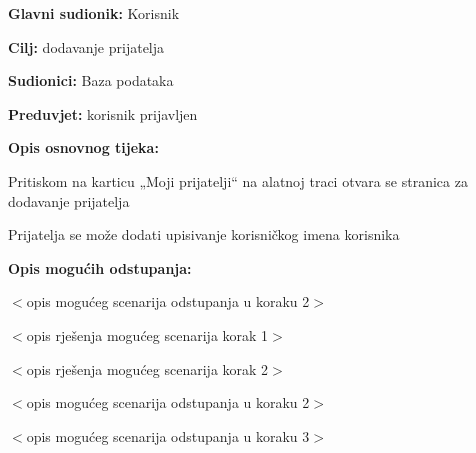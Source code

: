 		\noindent {}
	\begin{packed_item}
		
		\item \textbf{Glavni sudionik: }Korisnik
		\item  \textbf{Cilj:} dodavanje prijatelja
		\item  \textbf{Sudionici:}
		Baza podataka
		\item  \textbf{Preduvjet:} korisnik prijavljen
		\item  \textbf{Opis osnovnog tijeka:}
		
		\item[] \begin{packed_enum}
			
			\item	Pritiskom na karticu „Moji prijatelji“ na alatnoj traci otvara se stranica za dodavanje prijatelja
			\item	Prijatelja se može dodati upisivanje korisničkog imena korisnika
			
		\end{packed_enum}
		
		\item  \textbf{Opis mogućih odstupanja:}
		
		\item[] \begin{packed_item}
			
			\item[2.a] $<$opis mogućeg scenarija odstupanja u koraku 2$>$
			\item[] \begin{packed_enum}
				
				\item $<$opis rješenja mogućeg scenarija korak 1$>$
				\item $<$opis rješenja mogućeg scenarija korak 2$>$
				
			\end{packed_enum}
			\item[2.b] $<$opis mogućeg scenarija odstupanja u koraku 2$>$
			\item[3.a] $<$opis mogućeg scenarija odstupanja  u koraku 3$>$
			
		\end{packed_item}
	\end{packed_item}

